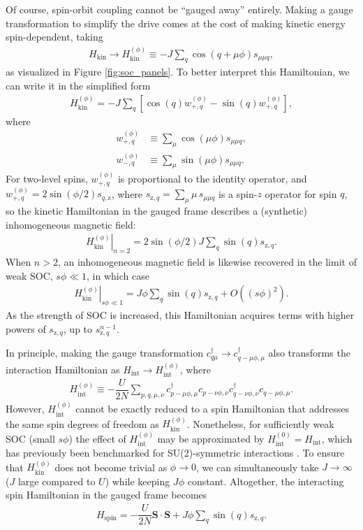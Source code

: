 \documentclass[nofootinbib,twocolumn]{revtex4-2}
\renewcommand{\t}{\text} %
\newcommand{\f}[2]{\dfrac{#1}{#2}} %
\newcommand{\p}[1]{\left(#1\right)} %
\renewcommand{\sp}[1]{\left[#1\right]} %
\renewcommand{\v}{\bm} %
\renewcommand{\c}{\cdot} %
\newcommand{\1}{\mathds{1}}
\newcommand{\z}{\text{z}}
\begin{document}
Of course, spin-orbit coupling cannot be ``gauged away'' entirely.
Making a gauge transformation to simplify the drive comes at the cost of making kinetic energy spin-dependent, taking
\begin{align}
  H_{\t{kin}} \to H_{\t{kin}}^{(\phi)}
  \equiv -J \sum_q \cos\p{q+\mu\phi} s_{\mu\mu q},
\end{align}
as visualized in Figure \ref{fig:soc_panels}.
To better interpret this Hamiltonian, we can write it in the simplified form
\begin{align}
  H_{\t{kin}}^{(\phi)}
  = -J \sum_q
  \sp{\cos\p{q} w_{+,q}^{(\phi)} - \sin\p{q} w_{+,q}^{(\phi)}},
\end{align}
where
\begin{align}
  w_{+,q}^{(\phi)} &\equiv \sum_\mu \cos\p{\mu\phi} s_{\mu\mu q}, \\
  w_{-,q}^{(\phi)} &\equiv \sum_\mu \sin\p{\mu\phi} s_{\mu\mu q}.
\end{align}
For two-level spins, $w_{+,q}^{(\phi)}$ is proportional to the identity operator, and $w_{+,q}^{(\phi)}=2\sin\p{\phi/2} s_{q,\z}$, where $s_{\z,q}=\sum_\mu \mu\, s_{\mu\mu q}$ is a spin-$z$ operator for spin $q$, so the kinetic Hamiltonian in the gauged frame describes a (synthetic) inhomogeneous magnetic field:
\begin{align}
  \left. H_{\t{kin}}^{(\phi)} \right|_{n=2}
  = 2\sin\p{\phi/2} J \sum_q \sin\p{q} s_{\z,q}.
\end{align}
When $n>2$, an inhomogeneous magnetic field is likewise recovered in the limit of weak SOC, $s\phi\ll1$, in which case
\begin{align}
  \left. H_{\t{kin}}^{(\phi)} \right|_{s\phi\ll1}
  = J\phi \sum_q \sin\p{q} s_{\z,q} + O\p{(s\phi)^2}.
\end{align}
As the strength of SOC is increased, this Hamiltonian acquires terms with higher powers of $s_{\z,q}$, up to $s_{\z,q}^{n-1}$.

In principle, making the gauge transformation $c_{q\mu}^\dag\to c_{q-\mu\phi,\mu}^\dag$ also transforms the interaction Hamiltonian as $H_{\t{int}} \to H_{\t{int}}^{(\phi)}$, where
\begin{align}
  H_{\t{int}}^{(\phi)}
  \equiv -\f{U}{2N} \sum_{p,q,\mu,\nu}
  c_{p-\mu\phi,\mu}^\dag c_{p-\nu\phi,\nu}
  c_{q-\nu\phi,\nu}^\dag c_{q-\mu\phi,\mu}.
\end{align}
However, $H_{\t{int}}^{(\phi)}$ cannot be exactly reduced to a spin Hamiltonian that addresses the same spin degrees of freedom as $H_{\t{kin}}^{(\phi)}$.
Nonetheless, for sufficiently weak SOC (small $s\phi$) the effect of $H_{\t{int}}^{(\phi)}$ may be approximated by $H_{\t{int}}^{(0)}=H_{\t{int}}$, which has previously been benchmarked for SU(2)-symmetric interactions \cite{he2019engineering, smale2019observation}.
To ensure that $H_{\t{kin}}^{(\phi)}$ does not become trivial as $\phi\to0$, we can simultaneously take $J\to\infty$ ($J$ large compared to $U$) while keeping $J\phi$ constant.
Altogether, the interacting spin Hamiltonian in the gauged frame becomes
\begin{align}
  H_{\t{spin}} = -\f{U}{2N} \v S\c\v S + J\phi \sum_q \sin\p{q} s_{\z,q}.
  \label{eq:H_spin}
\end{align}
\end{document}
